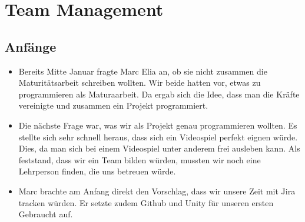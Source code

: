 \chapter{Team Management}

\section{Anfänge}
\begin{itemize}
    \item Bereits Mitte Januar fragte Marc Elia an, ob sie nicht zusammen die Maturitätsarbeit schreiben wollten. Wir beide hatten vor, etwas zu programmieren als Maturaarbeit. Da ergab sich die Idee, dass man die 
    Kräfte vereinigte und zusammen ein Projekt programmiert. 
    \item Die nächste Frage war, was wir als Projekt genau programmieren wollten. Es stellte sich sehr schnell heraus, dass sich ein Videospiel perfekt eignen würde. Dies, da man sich bei einem Videospiel unter anderem frei 
    ausleben kann. Als feststand, dass wir ein Team bilden würden, mussten wir noch eine Lehrperson finden, die uns betreuen würde.
    \item Marc brachte am Anfang direkt den Vorschlag, dass wir unsere Zeit mit Jira tracken würden. Er setzte zudem Github und Unity für unseren ersten Gebraucht auf. 
\end{itemize}

